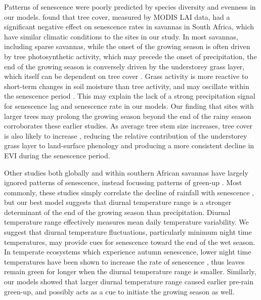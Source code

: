 \begin{refsection}
Patterns of senescence were poorly predicted by species diversity and evenness in our models. \citet{Cho2017} found that tree cover, measured by MODIS LAI data, had a significant negative effect on senescence rates in savannas in South Africa, which have similar climatic conditions to the sites in our study. In most savannas, including sparse savannas, while the onset of the growing season is often driven by tree photosynthetic activity, which may precede the onset of precipitation, the end of the growing season is conversely driven by the understorey grass layer, which itself can be dependent on tree cover \citep{Cho2017, Guan2014}. Grass activity is more reactive to short-term changes in soil moisture than tree activity, and may oscillate within the senescence period \citep{Archibald2007}. This may explain the lack of a strong precipitation signal for senescence lag and senescence rate in our models. Our finding that sites with larger trees may prolong the growing season beyond the end of the rainy season corroborates these earlier studies. As average tree stem size increases, tree cover is also likely to increase \citep{Panzou2020}, reducing the relative contribution of the understorey grass layer to land-surface phenology and producing a more consistent decline in EVI during the senescence period. 

Other studies both globally and within southern African savannas have largely ignored patterns of senescence, instead focussing patterns of green-up \citep{Gallinat2015}. Most commonly, these studies simply correlate the decline of rainfall with senescence \citep{Stevens2016, Guan2014}, but our best model suggests that diurnal temperature range is a stronger determinant of the end of the growing season than precipitation. Diurnal temperature range effectively measures mean daily temperature variability. We suggest that diurnal temperature fluctuations, particularly minimum night time temperatures, may provide cues for senescence toward the end of the wet season. In temperate ecosystems which experience autumn senescence, lower night time temperatures have been shown to increase the rate of senescence \citep{Michelson2017, Escamilla2020}, thus leaves remain green for longer when the diurnal temperature range is smaller. Similarly, our models showed that larger diurnal temperature range caused earlier pre-rain green-up, and possibly acts as a cue to initiate the growing season as well.


\end{refsection}
